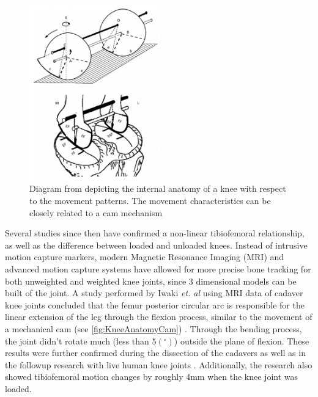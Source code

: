 \begin{figure}[ht!]
    \centering
    \includegraphics[width=0.5\textwidth]{Figures/Background/KneeAnatomy1.png}
    \caption{Diagram from \cite{MRIKneeShape_Unloaded} depicting the internal anatomy of a knee with respect to the movement patterns. The movement characteristics can be closely related to a cam mechanism}
    \label{fig:KneeAnatomyCam}
\end{figure}

Several studies since then have confirmed a non-linear tibiofemoral relationship, as well as the difference between loaded and unloaded knees. Instead of intrusive motion capture markers, modern Magnetic Resonance Imaging (MRI) and advanced motion capture systems \cite{ModelAnalysisDeepKneeFlexion} have allowed for more precise bone tracking for both unweighted and weighted knee joints, since 3 dimensional models can be built of the joint. A study performed by Iwaki \textit{et. al} using MRI data of cadaver knee joints concluded that the femur posterior circular arc is responsible for the linear extension of the leg through the flexion process, similar to the movement of a mechanical cam (see \autoref{fig:KneeAnatomyCam}) \cite{MRIKneeShape_Unloaded}. Through the bending process, the joint didn't rotate much (less than \(5(^\circ)\)) outside the plane of flexion. These results were further confirmed during the dissection of the cadavers as well as in the followup research with live human knee joints \cite{MRIKneeShape_Loaded}. Additionally, the research also showed tibiofemoral motion changes by roughly 4mm when the knee joint was loaded.

